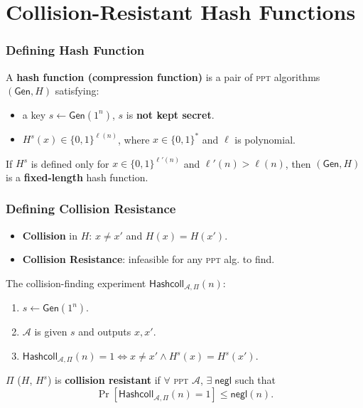 \section{Collision-Resistant Hash Functions}
\begin{frame}\frametitle{Defining Hash Function}
\begin{figure}
\begin{center}

\end{center}
\end{figure}
\begin{definition}
A \textbf{hash function (compression function)} is a pair of \textsc{ppt} algorithms $(\mathsf{Gen}, H)$ satisfying:
\begin{itemize}
\item a key $s \gets \mathsf{Gen}(1^n)$, $s$ is \textbf{not kept secret}.
\item $H^s(x) \in \{0,1\}^{\ell(n)}$, where $x \in \{0,1\}^*$ and $\ell$ is polynomial.
\end{itemize}
If $H^s$ is defined only for $x \in \{0,1\}^{\ell'(n)}$ and $\ell'(n) > \ell(n)$, then $(\mathsf{Gen}, H)$ is a \textbf{fixed-length} hash function.
\end{definition}
\end{frame}
\begin{frame}\frametitle{Defining Collision Resistance}
\begin{itemize}
\item \textbf{Collision} in $H$: $x \neq x'$ and $H(x) = H(x')$.
\item \textbf{Collision Resistance}: infeasible for any \textsc{ppt} alg. to find.
\end{itemize}
The collision-finding experiment $\mathsf{Hashcoll}_{\mathcal{A},\Pi}(n)$:
\begin{enumerate}
\item $s \gets \mathsf{Gen}(1^n)$.
\item $\mathcal{A}$ is given $s$ and outputs $x, x'$.
\item $\mathsf{Hashcoll}_{\mathcal{A},\Pi}(n) =1 \iff x\ne x' \land H^s(x) = H^s(x')$.
\end{enumerate}
\begin{definition}
$\Pi$ ($H$, $H^s$) is \textbf{collision resistant} if $\forall$ \textsc{ppt} $\mathcal{A}$, $\exists\;\mathsf{negl}$ such that
\[ \Pr[\mathsf{Hashcoll}_{\mathcal{A},\Pi}(n)=1] \le \mathsf{negl}(n).
\]
\end{definition}
\end{frame}
